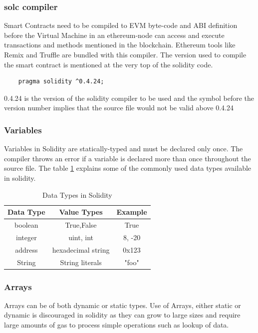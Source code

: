 \documentclass[11pt,openright]{report}
\begin{document}
\subsubsection{solc compiler}
Smart Contracts need to be compiled to EVM byte-code and ABI definition before the Virtual Machine in an ethereum-node can access and execute transactions and methods mentioned in the blockchain. Ethereum tools like Remix and Truffle are bundled with this compiler. The version used to compile the smart contract is mentioned at the very top of the solidity code.

\begin{lstlisting}
    pragma solidity ^0.4.24;
\end{lstlisting}

0.4.24 is the version of the solidity compiler to be used and the symbol before the version number implies that the source file would not be valid above 0.4.24

\subsubsection{Variables}
Variables in Solidity are statically-typed and must be declared only once. The compiler throws an error if a variable is declared more than once throughout the source file. The table \ref{solidity_data_types} explains some of the commonly used data types available in solidity.


\begin{table}[!htbp]
    \renewcommand{\arraystretch}{1.3}
    \caption{Data Types in Solidity}
    \label{solidity_data_types}
    \centering
    \begin{tabular}{|c|c|c|}
        \hline
        \bfseries Data Type & \bfseries Value Types & \bfseries Example \\
        \hline\hline
        boolean & True,False & True \\ \hline
        integer & uint, int & 8, -20 \\ \hline
        address & hexadecimal string & 0x123 \\ \hline
        String & String literals & "foo" \\ \hline
    \end{tabular}
\end{table}


\newpage
\subsubsection{Arrays}
Arrays can be of both dynamic or static types. Use of Arrays, either static or dynamic is discouraged in solidity as they can grow to large sizes and require large amounts of gas to process simple operations such as lookup of data.
\end{document}
